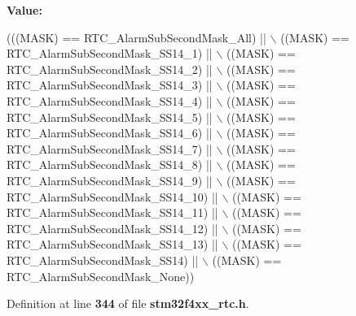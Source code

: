 {\bfseries Value\+:}
\begin{DoxyCode}
(((MASK) == RTC_AlarmSubSecondMask_All) || \(\backslash\)
                                              ((MASK) == 
      RTC_AlarmSubSecondMask_SS14_1) || \(\backslash\)
                                              ((MASK) == 
      RTC_AlarmSubSecondMask_SS14_2) || \(\backslash\)
                                              ((MASK) == 
      RTC_AlarmSubSecondMask_SS14_3) || \(\backslash\)
                                              ((MASK) == 
      RTC_AlarmSubSecondMask_SS14_4) || \(\backslash\)
                                              ((MASK) == 
      RTC_AlarmSubSecondMask_SS14_5) || \(\backslash\)
                                              ((MASK) == 
      RTC_AlarmSubSecondMask_SS14_6) || \(\backslash\)
                                              ((MASK) == 
      RTC_AlarmSubSecondMask_SS14_7) || \(\backslash\)
                                              ((MASK) == 
      RTC_AlarmSubSecondMask_SS14_8) || \(\backslash\)
                                              ((MASK) == 
      RTC_AlarmSubSecondMask_SS14_9) || \(\backslash\)
                                              ((MASK) == 
      RTC_AlarmSubSecondMask_SS14_10) || \(\backslash\)
                                              ((MASK) == 
      RTC_AlarmSubSecondMask_SS14_11) || \(\backslash\)
                                              ((MASK) == 
      RTC_AlarmSubSecondMask_SS14_12) || \(\backslash\)
                                              ((MASK) == 
      RTC_AlarmSubSecondMask_SS14_13) || \(\backslash\)
                                              ((MASK) == 
      RTC_AlarmSubSecondMask_SS14) || \(\backslash\)
                                              ((MASK) == 
      RTC_AlarmSubSecondMask_None))
\end{DoxyCode}


Definition at line \textbf{ 344} of file \textbf{ stm32f4xx\+\_\+rtc.\+h}.

\mbox{\label{group__RTC__Alarm__Sub__Seconds__Masks__Definitions_ga7ca3d2cc7822e86a0397137400bff1e8}} 
